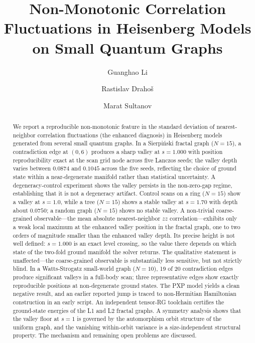 \documentclass[aps,prb,reprint,superscriptaddress]{revtex4-2}
\begin{document}
\title{Non-Monotonic Correlation Fluctuations in Heisenberg Models on Small Quantum Graphs}
\author{Guanghao Li}
\author{Rastislav Draho\v{s}}
\author{Marat Sultanov}

\begin{abstract}
We report a reproducible non-monotonic feature in the standard deviation of nearest-neighbor correlation fluctuations (the enhanced diagnosis) in Heisenberg models generated from several small quantum graphs. In a Sierpi\'{n}ski fractal graph ($N=15$), a contradiction edge at $(0,6)$ produces a sharp valley at $s=1.000$ with position reproducibility exact at the scan grid node across five Lanczos seeds; the valley depth varies between $0.0874$ and $0.1045$ across the five seeds, reflecting the choice of ground state within a near-degenerate manifold rather than statistical uncertainty. A degeneracy-control experiment shows the valley persists in the non-zero-gap regime, establishing that it is not a degeneracy artifact. Control scans on a ring ($N=15$) show a valley at $s=1.0$, while a tree ($N=15$) shows a stable valley at $s=1.70$ with depth about $0.0750$; a random graph ($N=15$) shows no stable valley. A non-trivial coarse-grained observable---the mean absolute nearest-neighbor $zz$ correlation---exhibits only a weak local maximum at the enhanced valley position in the fractal graph, one to two orders of magnitude smaller than the enhanced valley depth. Its precise height is not well defined: $s=1.000$ is an exact level crossing, so the value there depends on which state of the two-fold ground manifold the solver returns. The qualitative statement is unaffected---the coarse-grained observable is substantially less sensitive, but not strictly blind. In a Watts-Strogatz small-world graph ($N=10$), 19 of 20 contradiction edges produce significant valleys in a full-body scan; three representative edges show exactly reproducible positions at non-degenerate ground states. The PXP model yields a clean negative result, and an earlier reported jump is traced to non-Hermitian Hamiltonian construction in an early script. An independent tensor-RG toolchain certifies the ground-state energies of the L1 and L2 fractal graphs. A symmetry analysis shows that the valley floor at $s=1$ is governed by the automorphism orbit structure of the uniform graph, and the vanishing within-orbit variance is a size-independent structural property. The mechanism and remaining open problems are discussed.
\end{abstract}
\end{document}
